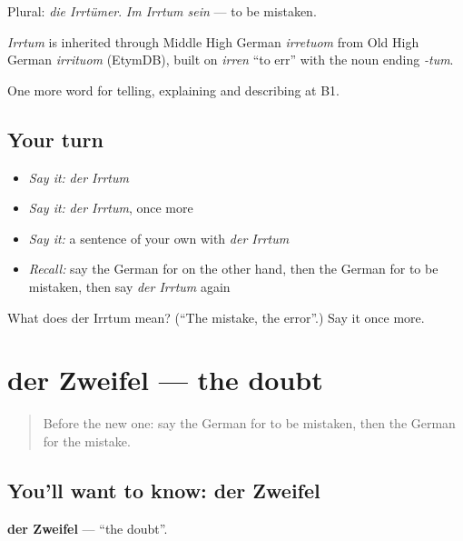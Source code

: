 Plural: \emph{die Irrtümer}. \emph{Im Irrtum sein} — to be mistaken.

\begin{cousinweb}
\emph{Irrtum} is inherited through Middle High German \emph{irretuom} from Old High German \emph{irrituom} (EtymDB), built on \emph{irren} \textquotedblleft{}to err\textquotedblright{} with the noun ending \emph{-tum}.
\end{cousinweb}

\begin{grammarlens}[title={What you've built}]
One more word for telling, explaining and describing at B1.
\end{grammarlens}

\subsection*{Your turn}
\begin{itemize}
\raggedright
  \item \emph{Say it:} \emph{der Irrtum}
  \item \emph{Say it:} \emph{der Irrtum}, once more
  \item \emph{Say it:} a sentence of your own with \emph{der Irrtum}
  \item \emph{Recall:} say the German for on the other hand, then the German for to be mistaken, then say \emph{der Irrtum} again
\end{itemize}

\begin{tcolorbox}[breakable,colback=teal!4,colframe=teal!35!black,title={Before you move on}]
What does der Irrtum mean? (\textquotedblleft{}The mistake, the error\textquotedblright{}.) Say it once more.
\end{tcolorbox}
\section[der Zweifel]{der Zweifel — the doubt}

\label{lesson:GE-C337-zweifel}



\begin{quote}
Before the new one: say the German for to be mistaken, then the German for the mistake.
\end{quote}

\subsection*{You'll want to know: der Zweifel}
\textbf{der Zweifel} — \textquotedblleft{}the doubt\textquotedblright{}.

